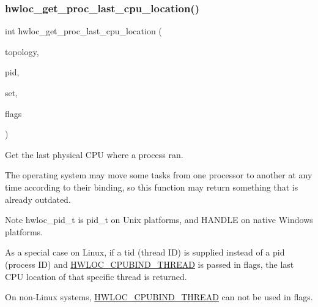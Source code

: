 \subsubsection{\texorpdfstring{hwloc\+\_\+get\+\_\+proc\+\_\+last\+\_\+cpu\+\_\+location()}{hwloc\_get\_proc\_last\_cpu\_location()}}
{\footnotesize\ttfamily int hwloc\+\_\+get\+\_\+proc\+\_\+last\+\_\+cpu\+\_\+location (\begin{DoxyParamCaption}\item[{\hyperlink{a00186_ga9d1e76ee15a7dee158b786c30b6a6e38}{hwloc\+\_\+topology\+\_\+t}}]{topology,  }\item[{hwloc\+\_\+pid\+\_\+t}]{pid,  }\item[{\hyperlink{a00183_ga4bbf39b68b6f568fb92739e7c0ea7801}{hwloc\+\_\+cpuset\+\_\+t}}]{set,  }\item[{int}]{flags }\end{DoxyParamCaption})}



Get the last physical C\+PU where a process ran. 

The operating system may move some tasks from one processor to another at any time according to their binding, so this function may return something that is already outdated.

\begin{DoxyNote}{Note}
{\ttfamily hwloc\+\_\+pid\+\_\+t} is {\ttfamily pid\+\_\+t} on Unix platforms, and {\ttfamily H\+A\+N\+D\+LE} on native Windows platforms.

As a special case on Linux, if a tid (thread ID) is supplied instead of a pid (process ID) and \hyperlink{a00190_gga217dc8d373f8958cc93c154ebce1c71caf1b6bbad00d7b1017b918e3719f4d421}{H\+W\+L\+O\+C\+\_\+\+C\+P\+U\+B\+I\+N\+D\+\_\+\+T\+H\+R\+E\+AD} is passed in flags, the last C\+PU location of that specific thread is returned.

On non-\/\+Linux systems, \hyperlink{a00190_gga217dc8d373f8958cc93c154ebce1c71caf1b6bbad00d7b1017b918e3719f4d421}{H\+W\+L\+O\+C\+\_\+\+C\+P\+U\+B\+I\+N\+D\+\_\+\+T\+H\+R\+E\+AD} can not be used in {\ttfamily flags}. 
\end{DoxyNote}
\mbox{\label{a00190_gaf13f765642b5d0d9a9813e6bb043671b}} 
